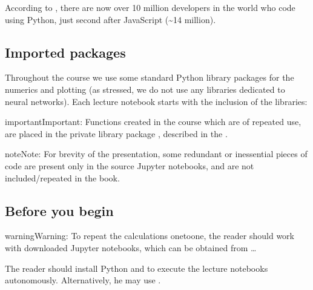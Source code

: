 \documentclass[letterpaper,10pt,english]{jupyterBook}
\begin{document}
\sphinxAtStartPar
According to , there are now over 10 million developers in the world who code using Python, just second after JavaScript (\textasciitilde{}14 million).


\subsection{Imported packages}
\label{\detokenize{docs/intro:imported-packages}}
\sphinxAtStartPar
Throughout the course we use some standard Python library packages for the numerics and plotting (as stressed, we do not use any libraries dedicated to neural networks). Each lecture notebook starts with the inclusion of the libraries:

\begin{sphinxVerbatim}[commandchars=\\\{\}]
   

   

     
\end{sphinxVerbatim}

\begin{sphinxadmonition}{important}{Important:}
\sphinxAtStartPar
Functions created in the course which are of repeated use, are placed in the private library package , described in the {\hyperref[\detokenize{docs/appendix:app-lab}]{}}.
\end{sphinxadmonition}

\begin{sphinxadmonition}{note}{Note:}
\sphinxAtStartPar
For brevity of the presentation, some redundant or inessential pieces of code are present only in the source Jupyter notebooks, and are not included/repeated in the book.
\end{sphinxadmonition}


\subsection{Before you begin}
\label{\detokenize{docs/intro:before-you-begin}}
\begin{sphinxadmonition}{warning}{Warning:}
\sphinxAtStartPar
To repeat the calculations one\sphinxhyphen{}to\sphinxhyphen{}one, the reader should work with downloaded Jupyter notebooks, which can be obtained from …

\sphinxAtStartPar
The reader should install Python and 
to execute the lecture notebooks autonomously. Alternatively, he may use .
\end{sphinxadmonition}
\end{document}
